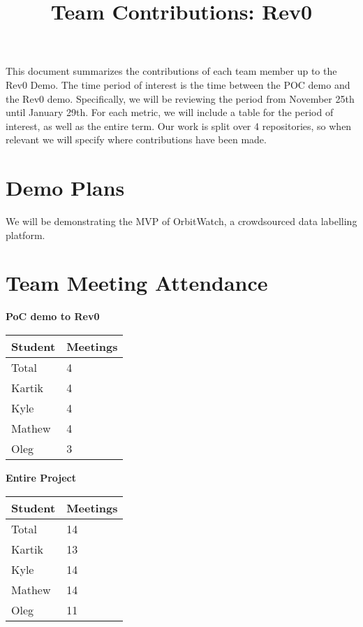 \documentclass{article}
\title{Team Contributions: Rev0\\\progname}
\author{\authname}
\date{}
\begin{document}
\maketitle

This document summarizes the contributions of each team member up to the Rev0
Demo. The time period of interest is the time between the POC demo
and the Rev0 demo. Specifically, we will be reviewing the period from November 25th until January 29th. For each metric, we will include a table for the period of interest, as well as the entire term. Our work is split over 4 repositories, so when relevant we will specify
where contributions have been made. 

\section{Demo Plans}



We will be demonstrating the MVP of OrbitWatch, a crowdsourced data labelling platform.


\section{Team Meeting Attendance}



\begin{table}[H]
\centering
\textbf{PoC demo to Rev0}\\
\begin{tabular}{ll}
\toprule
\textbf{Student} & \textbf{Meetings}\\
\midrule
Total & 4\\
Kartik & 4\\
Kyle & 4\\
Mathew & 4\\
Oleg & 3\\
\bottomrule
\end{tabular}
\end{table}


\begin{table}[H]
\centering
\textbf{Entire Project}\\
\begin{tabular}{ll}
\toprule
\textbf{Student} & \textbf{Meetings}\\
\midrule
Total & 14\\
Kartik & 13\\
Kyle & 14\\
Mathew & 14\\
Oleg & 11\\
\bottomrule
\end{tabular}
\end{table}
\end{document}
